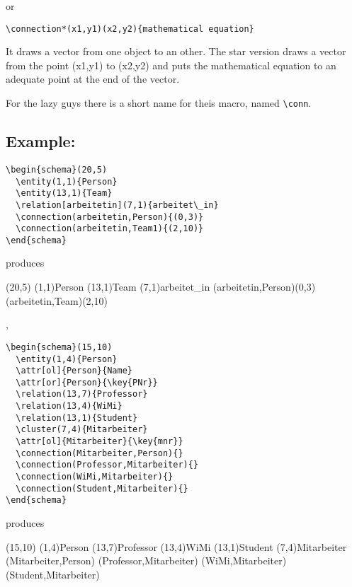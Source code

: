 \documentclass[a4paper,11pt]{article}
\begin{document}
or

\begin{verbatim}
\connection*(x1,y1)(x2,y2){mathematical equation}
\end{verbatim}

It draws a vector from one object to an other. The star version draws 
a vector from the point (x1,y1) to (x2,y2) and puts the mathematical 
equation to an adequate point at the end of the vector.

For the lazy guys there is a short name for theis macro, named \verb|\conn|. 

\subsection*{Example:}

\begin{verbatim}
\begin{schema}(20,5)
  \entity(1,1){Person}
  \entity(13,1){Team}
  \relation[arbeitetin](7,1){arbeitet\_in}
  \connection(arbeitetin,Person){(0,3)}
  \connection(arbeitetin,Team1){(2,10)}
\end{schema}
\end{verbatim}

produces

\begin{schema}(20,5)
  \entity(1,1){Person}
  \entity(13,1){Team}
  \relation[arbeitetin](7,1){arbeitet\_in}
  \connection(arbeitetin,Person){(0,3)}
  \connection(arbeitetin,Team){(2,10)}
\end{schema}

, 

\begin{verbatim}
\begin{schema}(15,10)
  \entity(1,4){Person}
  \attr[ol]{Person}{Name}
  \attr[or]{Person}{\key{PNr}}
  \relation(13,7){Professor}
  \relation(13,4){WiMi}
  \relation(13,1){Student}
  \cluster(7,4){Mitarbeiter}
  \attr[ol]{Mitarbeiter}{\key{mnr}}
  \connection(Mitarbeiter,Person){}
  \connection(Professor,Mitarbeiter){}
  \connection(WiMi,Mitarbeiter){}
  \connection(Student,Mitarbeiter){}
\end{schema}
\end{verbatim}

produces

\begin{schema}(15,10)
  \entity(1,4){Person}
  \relation(13,7){Professor}
  \relation(13,4){WiMi}
  \relation(13,1){Student}
  \cluster(7,4){Mitarbeiter}
  \connection(Mitarbeiter,Person){}
  \connection(Professor,Mitarbeiter){}
  \connection(WiMi,Mitarbeiter){}
  \connection(Student,Mitarbeiter){}
\end{schema}
\end{document}
